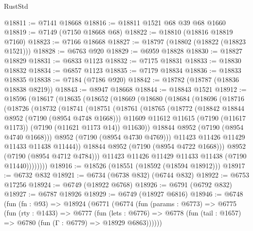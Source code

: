 \begin{lexlean}{RustStd}
\begin{coremodule}
@18811 := @7141 @18668
@18816 := @18811 @1521 @68 @39 @68 @1660
@18819 := @7149 (@7150 @18668 @68)
@18822 := @18810 (@18816 @18819 @7160)
@18823 := @7166 @18668
@18827 := @18797 (@18802 (@18822 (@18823 @1521)))
@18828 := @6763 @920
@18829 := @6959 @18828
@18830 := @18827 @18829
@18831 := @6833 @1123
@18832 := @7175 @18831
@18833 := @18830 @18832
@18834 := @6857 @1123
@18835 := @7179 @18834
@18836 := @18833 @18835
@18838 := @7184 (@7186 @920)
@18842 := @18782 (@18787 (@18836 @18838 @8219))
@18843 := @8947 @18668
@18844 := @18843 @1521
@18912 := @18596
    (@18617
      (@18635
        (@18652
          (@18669
            (@18680
              (@18684
                (@18696
                  (@18716
                    (@18726
                      (@18732
                        (@18741
                          (@18751
                            (@18761
                              (@18765
                                (@18772
                                  (@18842 @18844 @8952 (@7190 (@8954 @4748 @1668)))
                                  @11609
                                  @11612
                                  @11615
                                  (@7190 (@11617 @1173))
                                  (@7190 (@11621 @1173 @14))
                                  @11630))
                              @18844
                              @8952
                              (@7190 (@8954 @4740 @1668)))
                            @8952
                            (@7190 (@8954 @4730 @4769)))
                          @11423
                          @11426
                          @11429
                          @11433
                          @11438
                          @11444))
                      @18844
                      @8952
                      (@7190 (@8954 @4722 @1668)))
                    @8952
                    (@7190 (@8954 @4712 @4784)))
                  @11423
                  @11426
                  @11429
                  @11433
                  @11438
                  (@7190 @11440))))))))
@18916 := @18526 (@18551 (@18592 (@18594 @18912)))
@18917 := @6732 @832
@18921 := @6734 (@6738 @832) (@6744 @832)
@18922 := @6753 @17256
@18924 := @6749 (@18922 @6768)
@18926 := @6791 (@6792 @832)
@18927 := @6787 @18926
@18929 := @6749 (@18927 @6816)
@18946 := @6748
    (fun (fn : @93) =>
    @18924
      (@6771
        (@6774
          (fun (params : @6773) =>
          @6775
            (fun (rty : @1433) =>
            @6777
              (fun (lets : @6776) =>
              @6778 (fun (tail : @1657) => @6780 (fun (Γ : @6779) => @18929 @6863))))))

\end{coremodule}
\end{lexlean}
